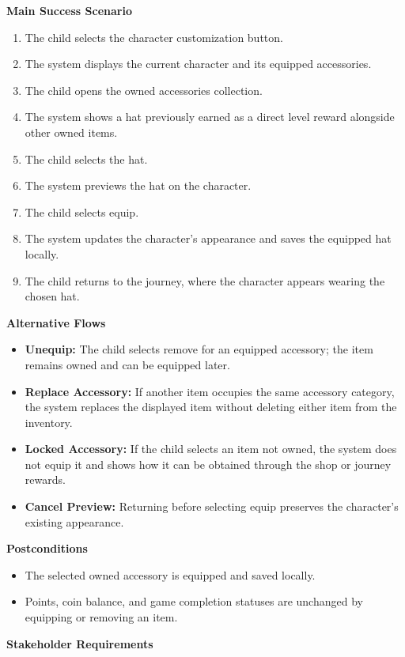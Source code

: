 \documentclass[10pt]{article}
\begin{document}
\textbf{Main Success Scenario}
\begin{enumerate}
    \item The child selects the character customization button.
    \item The system displays the current character and its
    equipped accessories.
    \item The child opens the owned accessories collection.
    \item The system shows a hat previously earned as a direct
    level reward alongside other owned items.
    \item The child selects the hat.
    \item The system previews the hat on the character.
    \item The child selects equip.
    \item The system updates the character's appearance and saves
    the equipped hat locally.
    \item The child returns to the journey, where the character
    appears wearing the chosen hat.
\end{enumerate}

\textbf{Alternative Flows}
\begin{itemize}
    \item \textbf{Unequip:} The child selects remove for an equipped
    accessory; the item remains owned and can be equipped later.
    \item \textbf{Replace Accessory:} If another item occupies the
    same accessory category, the system replaces the displayed item
    without deleting either item from the inventory.
    \item \textbf{Locked Accessory:} If the child selects an item not
    owned, the system does not equip it and shows how it can be
    obtained through the shop or journey rewards.
    \item \textbf{Cancel Preview:} Returning before selecting equip
    preserves the character's existing appearance.
\end{itemize}

\textbf{Postconditions}
\begin{itemize}
    \item The selected owned accessory is equipped and saved locally.
    \item Points, coin balance, and game completion statuses
    are unchanged by equipping or removing an item.
\end{itemize}

\textbf{Stakeholder Requirements}
\end{document}
